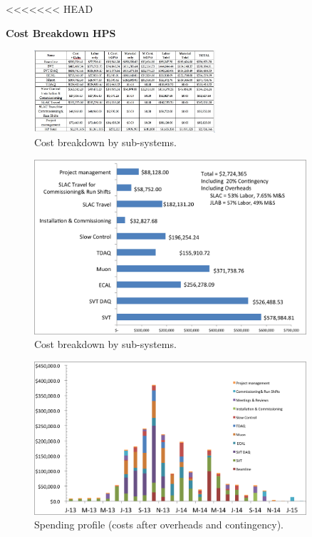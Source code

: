 <<<<<<< HEAD
{\bf {\large Cost Breakdown HPS}

\begin{figure}[h]
\centering
\includegraphics[angle=90,width=0.6\textwidth]{cost_schedule/cost_systems_table.jpg} 
\caption{Cost breakdown by sub-systems.}
\label{fig:cost}
\end{figure}

\begin{figure}[h]
\centering
\includegraphics[width=0.9\textwidth]{cost_schedule/cost_systems.jpg} 
\caption{Cost breakdown by sub-systems.}
\label{fig:cost}
\end{figure}

\begin{figure}[h]
\centering
\includegraphics[width=0.9\textwidth]{cost_schedule/spending.jpg} 
\caption{Spending profile (costs after overheads and contingency).}
\label{fig:spending}
\end{figure}

}

